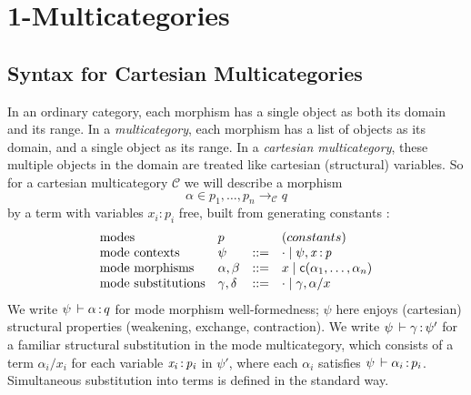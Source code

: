 {
\newcommand\magicwand{\mathrel{-\mkern-6mu*}}
\newcommand\mor[3]{\ensuremath{#2} \longrightarrow_#1 #3}
\newcommand\C{\ensuremath{\mathcal{C}}}
\newcommand\D{\ensuremath{\mathcal{D}}}
\newcommand\E{\ensuremath{\mathcal{E}}}
\newcommand\deq{\ensuremath{\equiv}}
\newcommand\seq[3]{\ensuremath{#1 \vdash_{#2} #3}}
\newcommand\F[2]{\ensuremath{\dsd{F}_{#1}(#2)}}
\newcommand\U[3]{\ensuremath{\dsd{U}_{#1}(#2 \mid #3)}}
\newcommand\Fsymb[0]{\dsd{F}}
\newcommand\Usymb[0]{\dsd{U}}
\newcommand\tsubst[2]{\ensuremath{#1[#2]}}
\renewcommand\subst[3]{\ensuremath{#1[#2/#3]}}
\newcommand\wftype[2]{\ensuremath{#1 \: \dsd{type}_{#2}}}
\renewcommand\wfctx[2]{\ensuremath{#1 \: \dsd{ctx}_{#2}}}
\newcommand\modeof[1]{\ensuremath{\hat{#1}}}
\newcommand\many[1]{\ensuremath{\overline{#1}}}
\renewcommand{\oftp}[3]{\ensuremath{#1 \, \vdash #2 \, \dcd{:} \, #3}}
\newcommand\FL{\dsd{FL}}
\newcommand\FR{\dsd{FR}}
\newcommand\UL{\dsd{UL}}
\newcommand\UR{\dsd{UR}}
\newcommand\lolli\multimap
\newcommand\la\dashv

\section{1-Multicategories}

\subsection{Syntax for Cartesian Multicategories}
In an ordinary category, each morphism has a single object as both its
domain and its range.  In a \emph{multicategory}, each morphism has a
list of objects as its domain, and a single object as its range.  In a
\emph{cartesian multicategory}, these multiple objects in the domain are
treated like cartesian (structural) variables. So for a cartesian
multicategory \C\/ we will describe a morphism
\[
\alpha \in \mor{\C}{p_1,\ldots,p_n}{q}
\]
by a term with variables $x_i:p_i$ free, built from generating constants
:
\[
\begin{array}{llll}
\text{modes} & p & & (constants) \\
\text{mode contexts} & \psi & ::= & \cdot \mid \psi,\mathit{x} \, \mathit{:} \, \mathit{p} \\
\text{mode morphisms} & \alpha,\beta & ::= & x \mid \mathsf{c}(\alpha_1,\ldots,\alpha_n) \\
\text{mode substitutions} & \gamma,\delta & ::= & \cdot \mid \gamma,\alpha/x\\
\end{array}
\]
We write $\oftp{\psi}{\alpha}{q}$ for mode morphism well-formedness;
$\psi$ here enjoys (cartesian) structural properties (weakening,
exchange, contraction).  We write $\oftp{\psi}{\gamma}{\psi'}$ for a
familiar structural substitution in the mode multicategory, which
consists of a term $\alpha_i/x_i$ for each variable $\mathit{x_i} \, \mathit{:} \, \mathit{p_i}$ in
$\psi'$, where each $\alpha_i$ satisfies $\oftp{\psi}{\alpha_i}{p_i}$.
Simultaneous substitution into terms is defined in the standard way.

}
